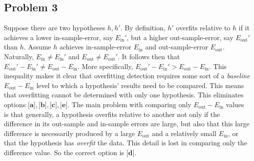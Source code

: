 \documentclass{article}
\begin{document}
\subsection*{Problem 3}
Suppose there are two hypotheses $h, h'$. By definition, $h'$ overfits relative to $h$ if it achieves a lower in-sample-error, say $E_{\text{in}}'$, but a higher out-sample-error, say $E_{\text{out}}'$ than $h$. Assume $h$ achieves in-sample-error $E_{\text{in}}$ and out-sample-error $E_{\text{out}}$. Naturally, $E_{\text{in}} \neq E_{\text{in}}'$ and $E_{\text{out}} \neq E_{\text{out}}'$. It follows then that $E_{\text{out}}' - E_{\text{in}}' \neq E_{\text{out}} - E_{\text{in}}$. More specifically, $E_{\text{out}}' - E_{\text{in}}' > E_{\text{out}} - E_{\text{in}}$. This inequality makes it clear that overfitting detection requires some sort of a \emph{baseline} $E_{\text{out}} - E_{\text{in}}$ level to which a hypothesis' results need to be compared. This means that overfitting cannot be determined with only one hypothesis. This eliminates options $\textbf{[a]}, \textbf{[b]}, \textbf{[c]}, \textbf{[e]}$. The main problem with comparing only $E_{\text{out}} - E_{\text{in}}$ values is that generally, a hypothesis overfits relative to another not only if the difference in its out-sample and in-sample errors are large, but also that this large difference is necessarily produced by a large $E_{\text{out}}$ and a relatively small $E_{\text{in}}$, or that the hypothesis has \emph{overfit} the data. This detail is lost in comparing only the difference value. So the correct option is $\textbf{[d]}$.
\end{document}
